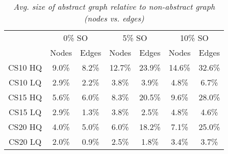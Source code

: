 \begin{table}[ht]
\begin{center}
\caption{\emph{Avg. size of abstract graph relative to non-abstract graph (nodes vs. edges)}}
\label{aha-table:graphsize}
\begin{tabular*}{0.49\textwidth}{@{\extracolsep{\fill}}ccccccc}%
  \hline
 & \multicolumn{2}{c}{0\% SO} & \multicolumn{2}{c}{5\% SO} & \multicolumn{2}{c}{10\% SO} \\
 & \small{Nodes} & \small{Edges} & \small{Nodes} & \small{Edges} & \small{Nodes} & \small{Edges} \\
  \hline
  \small{CS10 HQ} & \small{9.0\%} & \small{8.2\%} & \small{12.7\%} & \small{23.9\%} & \small{14.6\%} & \small{32.6\%} \\
  \small{CS10 LQ} & \small{2.9\%} & \small{2.2\%} & \small{3.8\%}  & \small{3.9\%}  & \small{4.8\%}  & \small{6.7\%} \\
  \small{CS15 HQ} & \small{5.6\%} & \small{6.0\%} & \small{8.3\%}  & \small{20.5\%} & \small{9.6\%}  & \small{28.0\%} \\
  \small{CS15 LQ} & \small{2.9\%} & \small{1.3\%} & \small{3.8\%}  & \small{2.5\%}  & \small{4.8\%}  & \small{4.6\%} \\
  \small{CS20 HQ} & \small{4.0\%} & \small{5.0\%} & \small{6.0\%}  & \small{18.2\%} & \small{7.1\%}  & \small{25.0\%} \\
  \small{CS20 LQ} & \small{2.0\%} & \small{0.9\%} & \small{2.5\%}  & \small{1.8\%}  & \small{3.4\%}  & \small{3.7\%} \\
   \hline
\end{tabular*}
\end{center}
\end{table}
